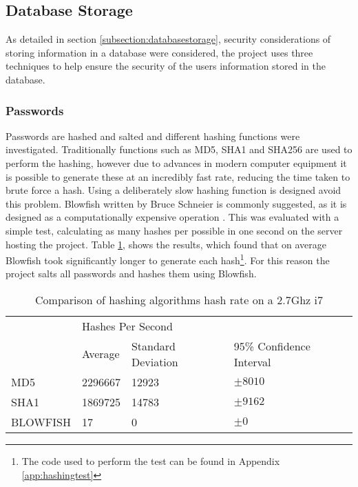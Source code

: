\subsection{Database Storage}
As detailed in section \ref{subsection:databasestorage}, security considerations of storing information in a database were considered, the project uses three techniques to help ensure the security of the users information stored in the database. 

\subsubsection{Passwords}
Passwords are hashed and salted and different hashing functions were investigated. Traditionally functions such as MD5, SHA1 and SHA256 are used to perform the hashing, however due to advances in modern computer equipment it is possible to generate these at an incredibly fast rate, reducing the time taken to brute force a hash.
%
Using a deliberately slow hashing function is designed avoid this problem. Blowfish written by Bruce Schneier is commonly suggested, as it is designed as a computationally expensive operation \parencite{schneier1994description} . This was evaluated with a simple test, calculating as many hashes per possible in one second on the server hosting the project. Table \ref{tab:hashingspeed}, shows the results, which found that on average Blowfish took significantly longer to generate each hash\footnote{The code used to perform the test can be found in Appendix \ref{app:hashingtest}}.
%
For this reason the project salts all passwords and hashes them using Blowfish.

\begin{table}[h]
\begin{tabular}{llll}
         & \multicolumn{3}{l}{Hashes Per Second}                   \\
         & Average & Standard Deviation & 95\% Confidence Interval \\
MD5      & \num{2296667} & \num{12923}  & $\pm 8010$   \\
SHA1     & \num{1869725} & \num{14783}  & $\pm 9162$    \\
BLOWFISH & 17            & 0            & $\pm 0$                 \\
\end{tabular}
\caption{Comparison of hashing algorithms hash rate on a 2.7Ghz i7}
\label{tab:hashingspeed}
\end{table}

